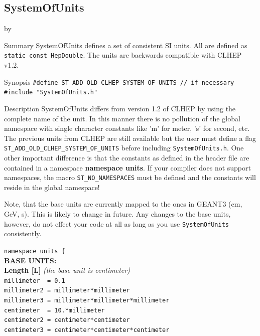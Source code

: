 \documentclass[twoside]{article}
\newcommand{\comp}[1]{\texttt{#1}}%
\newcommand{\entrylabel}[1]{\mbox{\textbf{{#1}}}\hfil}%
\newenvironment{entry}
{\begin{list}{}%
    {\renewcommand{\makelabel}{\entrylabel}%
     \setlength{\labelwidth}{90pt}%
     \setlength{\leftmargin}{\labelwidth}
     \advance\leftmargin by \labelsep%
      }%
    }%
  {\end{list}}
\newcommand{\Entrylabel}[1]%
{\raisebox{0pt}[1ex][0pt]{\makebox[\labelwidth][l]%
    {\parbox[t]{\labelwidth}{\hspace{0pt}\textbf{{#1}}}}}}
\newenvironment{Entry}%
{\renewcommand{\entrylabel}{\Entrylabel}\begin{entry}}%
  {\end{entry}}
\begin{document}
%
\subsection{SystemOfUnits} 
\label{SystemOfUnits}
\begin{Entry}
\item[Summary]
    SystemOfUnits defines a set of consistent SI units.
    All are defined as \comp{static const HepDouble}.
    The units are backwards compatible with CLHEP v1.2.

\item[Synopsis]
  \verb+#define ST_ADD_OLD_CLHEP_SYSTEM_OF_UNITS // if necessary+
  \verb+#include "SystemOfUnits.h"+
    
    
\item[Description] SystemOfUnits differs from version 1.2 of
    CLHEP by using the complete name of the unit.  In
    this manner there is no pollution of the global namespace with
    single character constants like 'm' for meter, 's' for second,
    etc.  The previous units from CLHEP are still available but the
    user must define a flag
    \texttt{ST\_ADD\_OLD\_CLHEP\_\-SYSTEM\_\-OF\_UNITS} before including
    \texttt{SystemOfUnits.h}.  One other important difference is that
    the constants as defined in the header file are contained in a
    namespace {\bf namespace units}.  If your
    compiler does not support namespaces, the macro
    \texttt{ST\_NO\_NAMESPACES} must be defined and the constants will
    reside in the global namespace!
    
    Note, that the base units are currently mapped to the ones in
    GEANT3 (cm, GeV, s).  This is likely to change in
    future. Any changes to the base units, however, do not effect your
    code at all as long as you use \texttt{SystemOfUnits}
    consistently.
  
  \verb+namespace units {+\\
  {\bf BASE UNITS: \\Length [L]} {\it (the base unit is centimeter)}\\
  \verb+millimeter  = 0.1+ \\  
  \verb+millimeter2 = millimeter*millimeter+\\
  \verb+millimeter3 = millimeter*millimeter*millimeter+\\

  \verb+centimeter  = 10.*millimeter+ \\
  \verb+centimeter2 = centimeter*centimeter+ \\
  \verb+centimeter3 = centimeter*centimeter*centimeter+ \\


\end{Entry}
\end{document}
